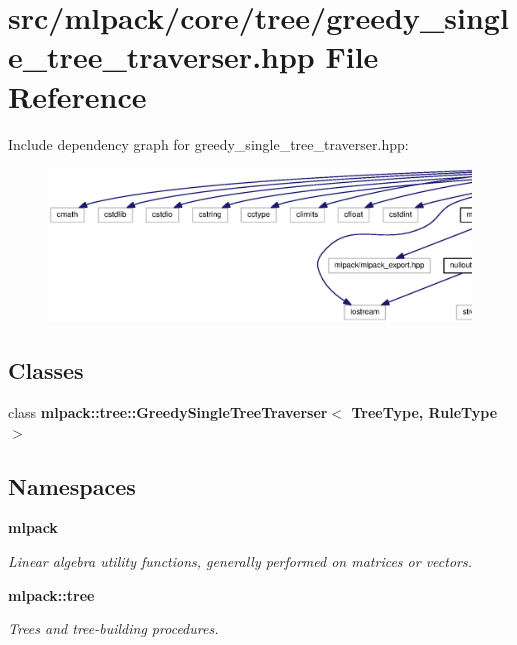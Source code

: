\section{src/mlpack/core/tree/greedy\+\_\+single\+\_\+tree\+\_\+traverser.hpp File Reference}
\label{greedy__single__tree__traverser_8hpp}
Include dependency graph for greedy\+\_\+single\+\_\+tree\+\_\+traverser.\+hpp\+:
\nopagebreak
\begin{figure}[H]
\begin{center}
\leavevmode
\includegraphics[width=350pt]{greedy__single__tree__traverser_8hpp__incl}
\end{center}
\end{figure}
\subsection*{Classes}
\begin{DoxyCompactItemize}
\item 
class {\bf mlpack\+::tree\+::\+Greedy\+Single\+Tree\+Traverser$<$ Tree\+Type, Rule\+Type $>$}
\end{DoxyCompactItemize}
\subsection*{Namespaces}
\begin{DoxyCompactItemize}
\item 
 {\bf mlpack}
\begin{DoxyCompactList}\small\item\em Linear algebra utility functions, generally performed on matrices or vectors. \end{DoxyCompactList}\item 
 {\bf mlpack\+::tree}
\begin{DoxyCompactList}\small\item\em Trees and tree-\/building procedures. \end{DoxyCompactList}\end{DoxyCompactItemize}
